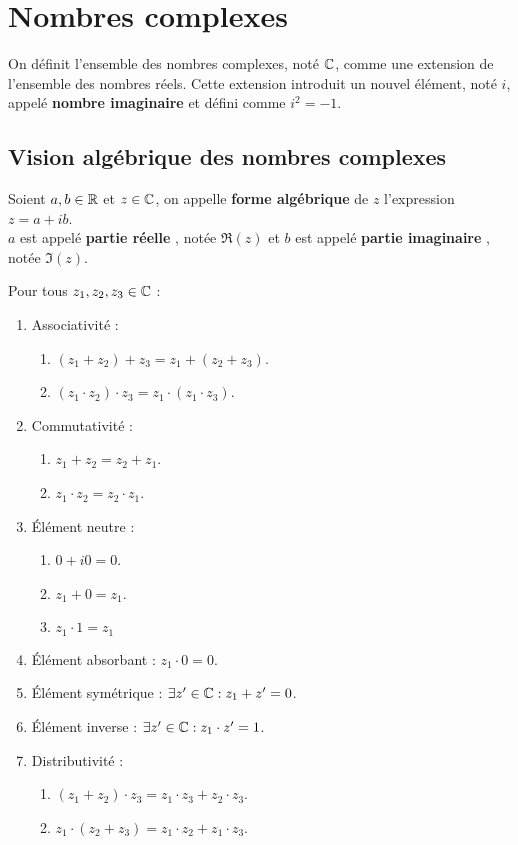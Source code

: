 \chapter{Nombres complexes}
\def\arraystretch{1}

On définit l'ensemble des nombres complexes, noté $\mathbb{C}$, comme une extension de l'ensemble des nombres réels.
Cette extension introduit un nouvel élément, noté $i$, appelé \textbf{nombre imaginaire} et défini comme $i^2=-1$.

\section{Vision algébrique des nombres complexes}
\begin{definition}
    Soient $a, b \in \mathbb{R}$ et $z \in \mathbb{C}$, on appelle \textbf{forme algébrique} de $z$ l'expression $z = a + ib$.
    \\
    $a$ est appelé \og \textbf{partie réelle} \fg, notée $\Re(z)$ et $b$ est appelé \og \textbf{partie imaginaire} \fg, notée $\Im(z)$.
\end{definition}

\begin{proposition}
	Pour tous $z_1, z_2, z_3 \in \mathbb{C}$ :
	\begin{enumerate}
		\item Associativité : 
		\begin{enumerate}
			\item $(z_1 + z_2) + z_3 = z_1 + (z_2 + z_3)$.
			\item $(z_1 \cdot z_2) \cdot z_3 = z_1 \cdot (z_1 \cdot z_3)$.
		\end{enumerate}
		\item Commutativité :
		\begin{enumerate}
			\item $z_1 + z_2 = z_2 + z_1$.
			\item $z_1 \cdot z_2 = z_2 \cdot z_1$.
		\end{enumerate}
		\item \'Elément neutre :
		\begin{enumerate}
			\item $0 + i0 = 0$.
			\item $z_1 + 0 = z_1$.
			\item $z_1 \cdot 1 = z_1$
		\end{enumerate}
		\item \'Elément absorbant : $z_1 \cdot 0 = 0$.
		\item \'Elément symétrique : $\exists z' \in \mathbb{C} : z_1 + z' = 0$.
		\item \'Elément inverse : $\exists z' \in \mathbb{C} :  z_1 \cdot z' = 1$.
		\item Distributivité :
		\begin{enumerate}
			\item $(z_1 + z_2) \cdot z_3 = z_1 \cdot z_3 + z_2 \cdot z_3$.
			\item $z_1 \cdot (z_2 + z_3) = z_1 \cdot z_2 + z_1 \cdot z_3$.
		\end{enumerate}
	\end{enumerate}
\end{proposition}


